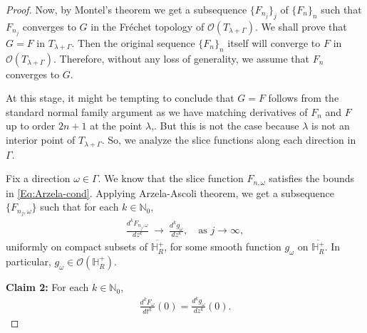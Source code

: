 \documentclass[11pt,reqno]{amsart}
\theoremstyle{plain}
\theoremstyle{definition}
\numberwithin{equation}{section}
\begin{document}
\begin{proof}
\vspace{2mm}

Now, by Montel's theorem we get a subsequence $\{F_{n_j}\}_j$ of $\{F_n\}_n$ such that $F_{n_j}$ converges to $G$ in the Fr\'echet topology of $\mathcal{O}(T_{\lambda+\Gamma})$. We shall prove that $G=F$ in $T_{\lambda + \Gamma}$. Then the original sequence $\{F_n\}_n$ itself will converge to $F$ in $\mathcal{O}(T_{\lambda+\Gamma})$. Therefore, without any loss of generality, we assume that $F_n$ converges to $G$. 

At this stage, it might be tempting to conclude that $G=F$ follows from the standard normal family argument as we have matching derivatives of $F_n$ and $F$ up to order $2n+1$ at the point $\lambda$,. But this is not the case because $\lambda$ is not an interior point of $T_{\lambda +\Gamma}$. So, we analyze the slice functions along each direction in $\Gamma$.

Fix a direction $\omega \in \Gamma$. We know that the slice function $F_{n, \omega}$ satisfies the bounds in \eqref{Eq:Arzela-cond}. Applying Arzela-Ascoli theorem, we get a subsequence $\{F_{n_j, \omega}\}$ such that for each $k\in \mathbb{N}_0$,
\begin{align}\label{Eq:Arzela-Ascoli}
\frac{d^k F_{n_j, \omega}}{dz^k} \  \rightarrow \ \frac{d^k g_\omega} {dz^k}, \quad \text{as } j\to \infty,
\end{align}
uniformly on compact subsets of $\overline{\mathbb{H}^+_R}$, for some smooth function $g_\omega$ on $\overline{\mathbb{H}^+_R}$. In particular, $g_\omega \in \mathcal{O}(\mathbb{H}^+_R)$.

\vspace{2mm}

\noindent \textbf{Claim 2:} For each $k\in \mathbb{N}_0$,
\begin{align}\label{Eq:equal-derivatives}
    \frac{d^k F_\omega}{dt^k}(0) = \frac{d^k g_\omega}{dz^k}(0).
\end{align}


\end{proof}
\end{document}
